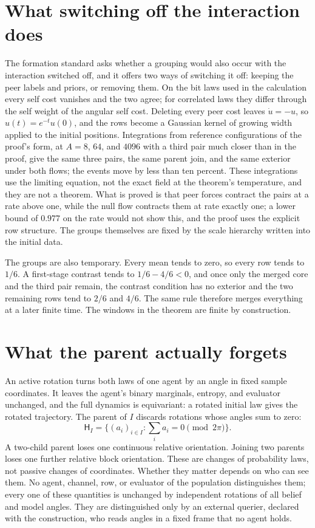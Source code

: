 \section{What switching off the interaction does}

The formation standard asks whether a grouping would also occur with the interaction switched off, and it offers two ways of switching it off: keeping the peer labels and priors, or removing them. On the bit laws used in the calculation every self cost vanishes and the two agree; for correlated laws they differ through the self weight of the angular self cost. Deleting every peer cost leaves $\dot u=-u$, so $u(t)=e^{-t}u(0)$, and the rows become a Gaussian kernel of growing width applied to the initial positions. Integrations from reference configurations of the proof's form, at $A=8$, $64$, and $4096$ with a third pair much closer than in the proof, give the same three pairs, the same parent join, and the same exterior under both flows; the events move by less than ten percent. These integrations use the limiting equation, not the exact field at the theorem's temperature, and they are not a theorem. What is proved is that peer forces contract the pairs at a rate above one, while the null flow contracts them at rate exactly one; a lower bound of $0.977$ on the rate would not show this, and the proof uses the explicit row structure. The groups themselves are fixed by the scale hierarchy written into the initial data.

The groups are also temporary. Every mean tends to zero, so every row tends to $1/6$. A first-stage contrast tends to $1/6-4/6<0$, and once only the merged core and the third pair remain, the contrast condition has no exterior and the two remaining rows tend to $2/6$ and $4/6$. The same rule therefore merges everything at a later finite time. The windows in the theorem are finite by construction.

\section{What the parent actually forgets}

An active rotation turns both laws of one agent by an angle in fixed sample coordinates. It leaves the agent's binary marginals, entropy, and evaluator unchanged, and the full dynamics is equivariant: a rotated initial law gives the rotated trajectory. The parent of $I$ discards rotations whose angles sum to zero:
\begin{equation}
\mathsf H_I=\{(a_i)_{i\in I}:\sum_i a_i=0\pmod{2\pi}\}.
\end{equation}
A two-child parent loses one continuous relative orientation. Joining two parents loses one further relative block orientation. These are changes of probability laws, not passive changes of coordinates. Whether they matter depends on who can see them. No agent, channel, row, or evaluator of the population distinguishes them; every one of these quantities is unchanged by independent rotations of all belief and model angles. They are distinguished only by an external querier, declared with the construction, who reads angles in a fixed frame that no agent holds.

